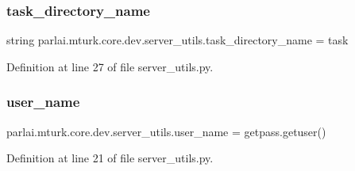 \subsubsection{\texorpdfstring{task\+\_\+directory\+\_\+name}{task\_directory\_name}}
{\footnotesize\ttfamily string parlai.\+mturk.\+core.\+dev.\+server\+\_\+utils.\+task\+\_\+directory\+\_\+name = \textquotesingle{}task\textquotesingle{}}



Definition at line 27 of file server\+\_\+utils.\+py.

\mbox{\label{namespaceparlai_1_1mturk_1_1core_1_1dev_1_1server__utils_aa1c891d191a109c1941a85bf62bd4888}} 
\subsubsection{\texorpdfstring{user\+\_\+name}{user\_name}}
{\footnotesize\ttfamily parlai.\+mturk.\+core.\+dev.\+server\+\_\+utils.\+user\+\_\+name = getpass.\+getuser()}



Definition at line 21 of file server\+\_\+utils.\+py.

